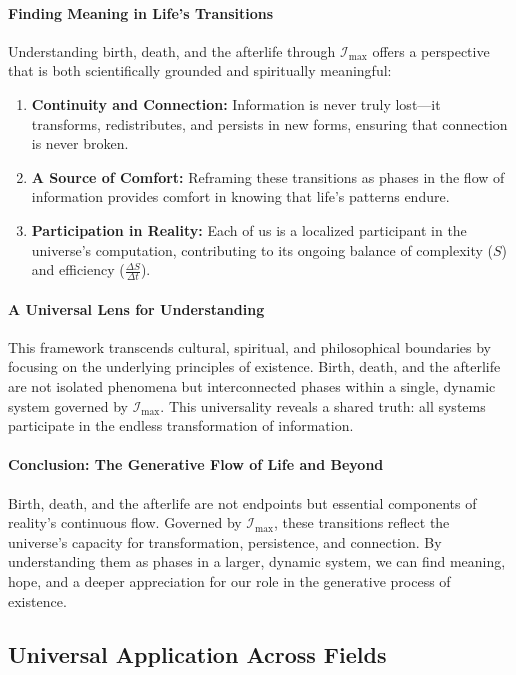\documentclass[12pt]{article}
\begin{document}
\paragraph{Finding Meaning in Life’s Transitions}
Understanding birth, death, and the afterlife through \(\mathcal{I}_{\text{max}}\) offers a perspective that is both scientifically grounded and spiritually meaningful:
\begin{enumerate}
    \item \textbf{Continuity and Connection:} Information is never truly lost—it transforms, redistributes, and persists in new forms, ensuring that connection is never broken.
    \item \textbf{A Source of Comfort:} Reframing these transitions as phases in the flow of information provides comfort in knowing that life’s patterns endure.
    \item \textbf{Participation in Reality:} Each of us is a localized participant in the universe’s computation, contributing to its ongoing balance of complexity (\(S\)) and efficiency (\(\frac{\Delta S}{\Delta t}\)).
\end{enumerate}

\paragraph{A Universal Lens for Understanding}
This framework transcends cultural, spiritual, and philosophical boundaries by focusing on the underlying principles of existence. Birth, death, and the afterlife are not isolated phenomena but interconnected phases within a single, dynamic system governed by \(\mathcal{I}_{\text{max}}\). This universality reveals a shared truth: all systems participate in the endless transformation of information.

\paragraph{Conclusion: The Generative Flow of Life and Beyond}
Birth, death, and the afterlife are not endpoints but essential components of reality’s continuous flow. Governed by \(\mathcal{I}_{\text{max}}\), these transitions reflect the universe’s capacity for transformation, persistence, and connection. By understanding them as phases in a larger, dynamic system, we can find meaning, hope, and a deeper appreciation for our role in the generative process of existence.

\subsection{Universal Application Across Fields}
\end{document}
